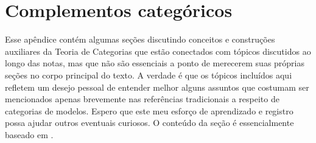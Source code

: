 \chapter{Complementos categóricos}

Esse apêndice contém algumas seções discutindo conceitos e construções auxiliares da Teoria de Categorias que estão conectados com tópicos discutidos ao longo das notas, mas que não são essenciais a ponto de merecerem suas próprias seções no corpo principal do texto.
A verdade é que os tópicos incluídos aqui refletem um desejo pessoal de entender melhor alguns assuntos que costumam ser mencionados apenas brevemente nas referências tradicionais a respeito de categorias de modelos.
Espero que este meu esforço de aprendizado e registro possa ajudar outros eventuais curiosos.
O conteúdo da seção é essencialmente baseado em \cite[Capítulo II, Seção 7]{cwm}.

